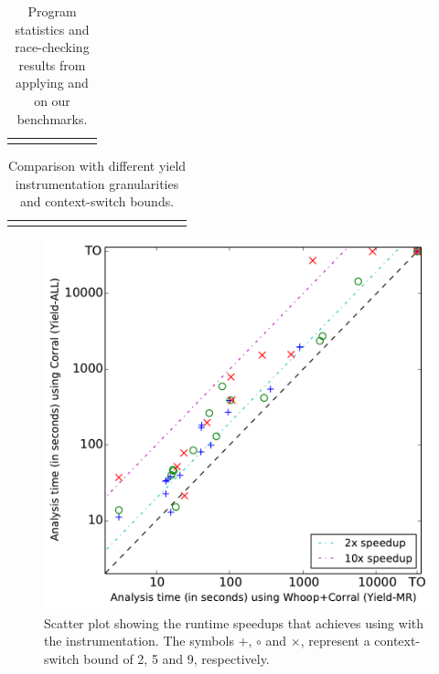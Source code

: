 \newcommand{\colspacing}{\hspace{1.8em}}
\begin{table}[t]
\small
\centering
\setlength{\tabcolsep}{0.3em}
\caption{Program statistics and race-checking results from applying \whoop and \corral on our benchmarks.}
\label{tab:stats}
\begin{tabular}{l rrr rr r}
\centering

\end{tabular}
\vspace{-3mm}
\end{table}

\begin{table}[t]
\small
\centering
\setlength{\tabcolsep}{0.45em}
\caption{Comparison with different yield instrumentation granularities and context-switch bounds.}
\label{tab:results}
\begin{tabular}{l r rrrr rrrr rrrr}
\centering

\end{tabular}
\vspace{-3mm}
\end{table}

\begin{figure}
\centering
\includegraphics[width=.99\linewidth]{experiments/figures/yieldmr_vs_yieldall.pdf}
\vspace{-2mm}
\caption{Scatter plot showing the runtime speedups that \corral achieves using \whoop with the \yieldmr instrumentation. The symbols $+$, $\circ$ and $\times$, represent a context-switch bound of 2, 5 and 9, respectively.}
\label{fig:plot}
\vspace{-2mm}
\end{figure}

